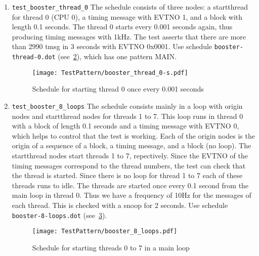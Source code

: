 \documentclass[12pt,a4paper]{report}
\begin{document}
\begin{enumerate}
Use schedule \\ \texttt{booster-thread-0-loop.dot} (see~\ref{fig:Schedule_booster_thread_0_loop}),
which has one pattern MAIN and starts thread 0 in a loop. This is a
theoretical setup to test that starting a running thread again does not
crash.
    \begin{figure}
        \centering
        \texttt{[image: TestPattern/booster\_thread\_0\_loop-s.pdf]}
        \caption{Schedule for startthread in a loop}
        \label{fig:Schedule_booster_thread_0_loop}
    \end{figure}
\item \texttt{test\_booster\_thread\_0}
The schedule consists of three nodes: a startthread for thread 0 (CPU 0), a timing message
with EVTNO 1, and a block with length 0.1 seconds. The thread 0 starts every 0.001 seconds again,
thus producing timing messages with 1kHz. The test asserts that there are more than
2990 tmsg in 3 seconds with EVTNO 0x0001. Use schedule \texttt{booster-thread-0.dot}
(see~\ref{fig:Schedule_booster_thread_0}), which has one pattern MAIN.
    \begin{figure}
        \centering
        \texttt{[image: TestPattern/booster\_thread\_0-s.pdf]}
        \caption{Schedule for starting thread 0 once every 0.001 seconds}
        \label{fig:Schedule_booster_thread_0}
    \end{figure}
\item \texttt{test\_booster\_8\_loops}
The schedule consists mainly in a loop with origin nodes and startthread nodes for threads 1 to 7.
This loop runs in thread 0 with a block of length 0.1 seconds and a timing message with EVTNO 0, which
helps to control that the test is working. Each of the origin nodes is the origin of a sequence of a block,
a timing message, and a block (no loop). The startthread nodes start threads 1 to 7, repectively.
Since the EVTNO of the timing messages correspond to the thread numbers, the test can check that
the thread is started. Since there is no loop for thread 1 to 7 each of these threads runs to idle.
The threads are started once every 0.1 second from the main loop in thread 0. Thus we have a frequency of 10Hz
for the messages of each thread. This is checked with a snoop for 2 seconds.
Use schedule \\ \texttt{booster-8-loops.dot} (see~\ref{fig:Schedule_booster_8_loops}).
    \begin{figure}
        \centering
        \texttt{[image: TestPattern/booster\_8\_loops.pdf]}
        \caption{Schedule for starting threads 0 to 7 in a main loop}
        \label{fig:Schedule_booster_8_loops}
    \end{figure}
\end{enumerate}
\end{document}
